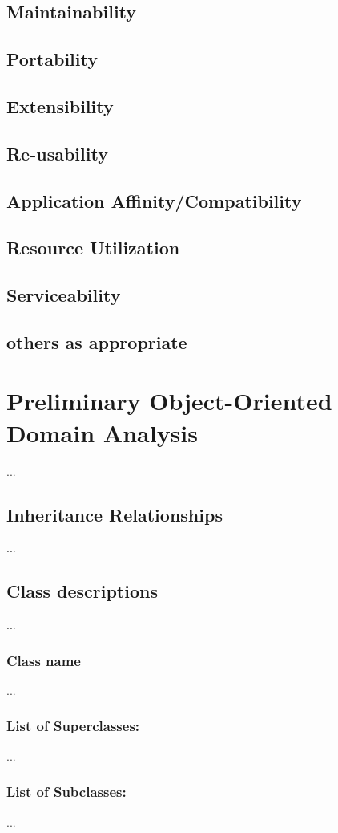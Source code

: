 \documentclass[]{article}
\begin{document}
\subsection {Maintainability}
\subsection {Portability}
\subsection {Extensibility}
\subsection {Re-usability}
\subsection {Application Affinity/Compatibility}
\subsection {Resource Utilization}
\subsection {Serviceability}
\subsection {others as appropriate}

\section{Preliminary Object-Oriented Domain Analysis}
...
\subsection{Inheritance Relationships}
...
\subsection{Class descriptions}
...
\subsubsection{ Class name}
... 
\subsubsection {List of Superclasses:} 
... 
\subsubsection {List of Subclasses:} 
... 
\end{document}
